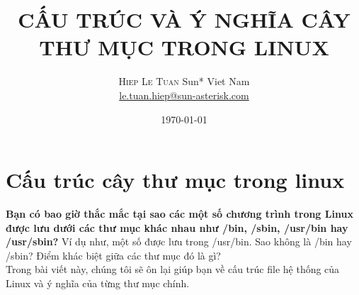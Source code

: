 \documentclass[twoside]{article}
\title{CẤU TRÚC VÀ Ý NGHĨA CÂY THƯ MỤC TRONG LINUX} %
\author{%
\textsc{Hiep Le Tuan} %
\normalsize Sun* Viet Nam \\ %
\normalsize \href{mailto:le.tuan.hiep@sun-asterisk.com}{le.tuan.hiep@sun-asterisk.com} 
}
\date{\today} %
\begin{document}
\maketitle

\section{Cấu trúc cây thư mục trong linux}
\textbf{Bạn có bao giờ thắc mắc tại sao các một số chương trình trong Linux được lưu dưới các thư mục khác nhau như /bin, /sbin, /usr/bin hay /usr/sbin?}
Ví dụ như, một số được lưu trong /usr/bin. Sao không là /bin hay /sbin? Điểm khác biệt giữa các thư mục đó là gì? \\
Trong bài viết này, chúng tôi sẽ ôn lại giúp bạn về cấu trúc file hệ thống của Linux và ý nghĩa của từng thư mục chính.
\end{document}
